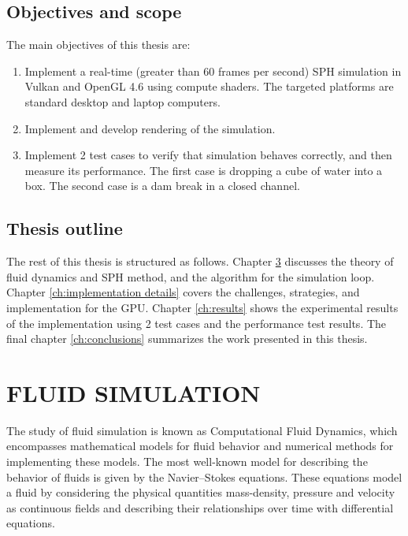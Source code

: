 \documentclass[a4paper, 12pt, oneside]{book}
\begin{document}
\section{Objectives and scope}

\begin{doublespace}
    The main objectives of this thesis are:
    
    \begin{enumerate}
        \item Implement a real-time (greater than 60 frames per second) SPH simulation in Vulkan and OpenGL 4.6 using compute shaders. The targeted platforms are standard desktop and laptop computers.
        \item Implement and develop rendering of the simulation.
        \item Implement 2 test cases to verify that simulation behaves correctly, and then measure its performance. The first case is dropping a cube of water into a box. The second case is a dam break in a closed channel.
    \end{enumerate}
\end{doublespace}

\section{Thesis outline}

\begin{doublespace}
     The rest of this thesis is structured as follows. Chapter \ref{ch:fluid simulation} discusses the theory of fluid dynamics and SPH method, and the algorithm for the simulation loop. Chapter \ref{ch:implementation details} covers the challenges, strategies, and implementation for the GPU. Chapter \ref{ch:results} shows the experimental results of the implementation using 2 test cases and the performance test results. The final chapter \ref{ch:conclusions} summarizes the work presented in this thesis.
\end{doublespace}

\chapter{FLUID SIMULATION}
\label{ch:fluid simulation}
\begin{doublespace}
The study of fluid simulation is known as Computational Fluid Dynamics, which encompasses mathematical models for fluid behavior and numerical methods for implementing these models. The most well-known model for describing the behavior of fluids is given by the Navier--Stokes equations. These equations model a fluid by considering the physical quantities mass-density, pressure and velocity as continuous fields and describing their relationships over time with differential equations.
\end{doublespace}
\end{document}

